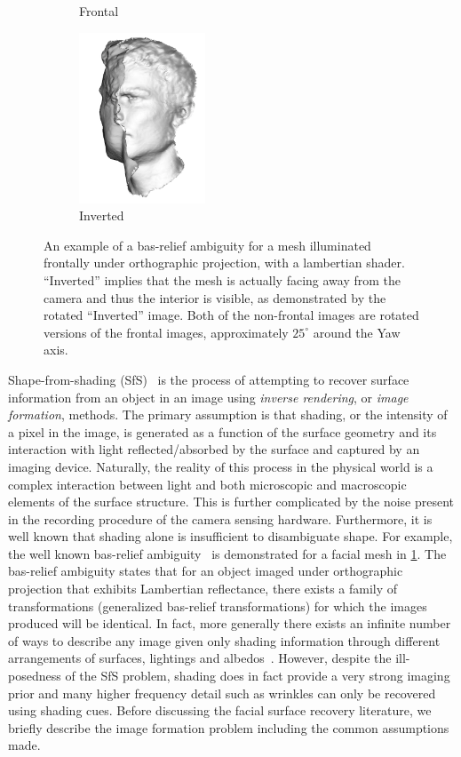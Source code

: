 \begin{figure}[t]
\begin{subfigure}[b]{0.24\textwidth}
		\caption*{Frontal}
	\end{subfigure}
	\begin{subfigure}[b]{0.24\textwidth}
		\centering
		\includegraphics[height=2in]{background/images/invert_rotate}
		\caption*{Inverted}
	\end{subfigure}
	\caption{An example of a bas-relief ambiguity for a mesh illuminated
	         frontally under orthographic projection, with a lambertian shader.
	         ``Inverted'' implies that the mesh is actually facing away from the
	         camera and thus the interior is visible, as demonstrated by the
	         rotated ``Inverted'' image. Both of the non-frontal images are
	         rotated versions of the frontal images, approximately $25^\circ$
	         around the Yaw axis.}
\label{fig:bg_sfs_bas_relief}
\end{figure}
Shape-from-shading (SfS)~\cite{horn1970shape} is the process of attempting to
recover surface information from an object in an image using \textit{inverse
rendering}, or \textit{image formation}, methods. The primary assumption is that
shading, or the intensity of a pixel in the image, is generated as a function of
the surface geometry and its interaction with light reflected/absorbed by the
surface and captured by an imaging device. Naturally, the reality of this
process in the physical world is a complex interaction between light and both
microscopic and macroscopic elements of the surface structure. This is further
complicated by the noise present in the recording procedure of the camera
sensing hardware. Furthermore, it is well known that shading alone is
insufficient to disambiguate shape. For example, the well known bas-relief
ambiguity~\cite{belhumeur1999bas} is demonstrated for a facial mesh in
\cref{fig:bg_sfs_bas_relief}. The bas-relief ambiguity states that for an object
imaged under orthographic projection that exhibits Lambertian reflectance, there
exists a family of transformations (generalized bas-relief transformations) for
which the images produced will be identical. In fact, more generally there
exists an infinite number of ways to describe any image given only shading
information through different arrangements of surfaces, lightings and
albedos~\cite{adelson1996perception}. However, despite the ill-posedness of the
SfS problem, shading does in fact provide a very strong imaging prior and many
higher frequency detail such as wrinkles can only be recovered using shading
cues. Before discussing the facial surface recovery literature, we briefly
describe the image formation problem including the common assumptions
made.
